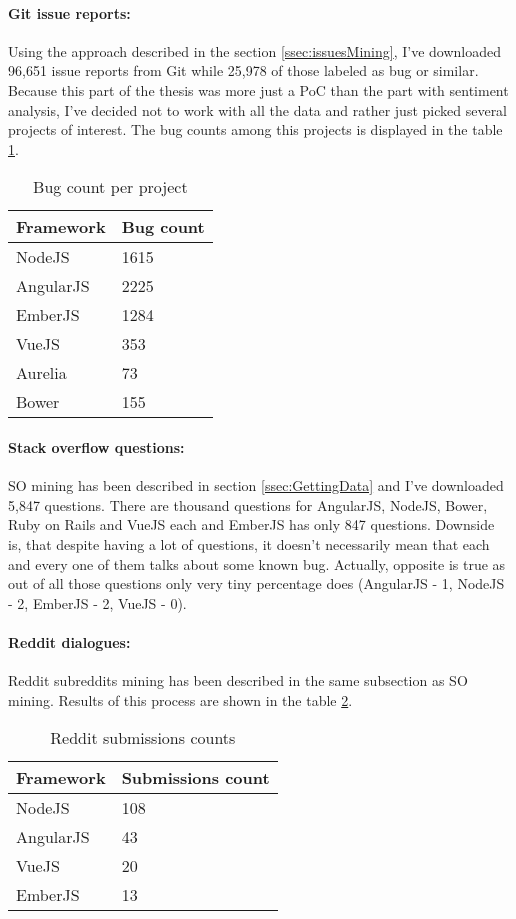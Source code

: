 \paragraph{Git issue reports:}
Using the approach described in the section \ref{ssec:issuesMining}, I've downloaded 96,651 issue reports from Git while 25,978 of those labeled as bug or similar. Because this part of the thesis was more just a PoC than the part with sentiment analysis, I've decided not to work with all the data and rather just picked several projects of interest. The bug counts among this projects is displayed in the table \ref{table:projectIssuesDistribution}.


\begin{table}[H]
\centering
\begin{tabular}{ |p{3cm}||p{3cm}|}
 \hline
\textbf{ Framework }& \textbf{Bug count}\\
 \hline
 NodeJS   & 1615\\ \hline
 AngularJS &   2225 \\ \hline
 EmberJS & 1284\\ \hline
 VueJS & 353\\ \hline
 Aurelia & 73\\ \hline
 Bower & 155\\ \hline
\end{tabular}
\caption{Bug count per project}
\label{table:projectIssuesDistribution}
\end{table}

\paragraph{Stack overflow questions:}
SO mining has been described in section \ref{ssec:GettingData} and I've downloaded 5,847 questions. There are thousand questions for AngularJS, NodeJS, Bower, Ruby on Rails and VueJS each and EmberJS has only 847 questions. Downside is, that despite having a lot of questions, it doesn't necessarily mean that each and every one of them talks about some known bug. Actually, opposite is true as out of all those questions only very tiny percentage does (AngularJS - 1, NodeJS - 2, EmberJS - 2, VueJS - 0).

\paragraph{Reddit dialogues:}Reddit subreddits mining has been described in the same subsection as SO mining. Results of this process are shown in the table \ref{table:redditDiscussionsDistribution}.


\begin{table}[H]
\centering
\begin{tabular}{ |p{3cm}||p{3cm}|}
 \hline
\textbf{ Framework }& \textbf{Submissions count}\\
 \hline
 NodeJS   &  108\\ \hline
 AngularJS &   43 \\ \hline
 VueJS & 20\\ \hline
 EmberJS & 13\\ \hline
\end{tabular}
\caption{Reddit submissions counts}
\label{table:redditDiscussionsDistribution}
\end{table}
